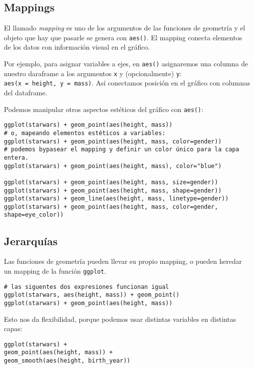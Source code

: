 \documentclass[]{article}
\begin{document}
\hypertarget{mappings}{%
\subsection{Mappings}\label{mappings}}

El llamado \emph{mapping} es uno de los argumentos de las funciones de
geometría y el objeto que hay que pasarle se genera con \texttt{aes()}.
El mapping conecta elementos de los datos con información visual en el
gráfico.

Por ejemplo, para asignar variables a ejes, en \texttt{aes()}
asignaremos una columna de nuestro daraframe a los argumentos \texttt{x}
y (opcionalmente) \texttt{y}: \texttt{aes(x\ =\ height,\ y\ =\ mass)}.
Así conectamos posición en el gráfico con columnas del dataframe.

Podemos manipular otros aspectos estéticos del gráfico con
\texttt{aes()}:

\begin{verbatim}
ggplot(starwars) + geom_point(aes(height, mass))
# o, mapeando elementos estéticos a variables:
ggplot(starwars) + geom_point(aes(height, mass, color=gender))
# podemos bypasear el mapping y definir un color único para la capa entera.
ggplot(starwars) + geom_point(aes(height, mass), color="blue")

ggplot(starwars) + geom_point(aes(height, mass, size=gender))
ggplot(starwars) + geom_point(aes(height, mass, shape=gender))
ggplot(starwars) + geom_line(aes(height, mass, linetype=gender)) 
ggplot(starwars) + geom_point(aes(height, mass, color=gender, shape=eye_color))
\end{verbatim}

\hypertarget{jerarquuxedas}{%
\subsection{Jerarquías}\label{jerarquuxedas}}

Las funciones de geometría pueden llevar su propio mapping, o pueden
heredar un mapping de la función \texttt{ggplot}.

\begin{verbatim}
# las siguentes dos expresiones funcionan igual
ggplot(starwars, aes(height, mass)) + geom_point()
ggplot(starwars) + geom_point(aes(height, mass))
\end{verbatim}

Esto nos da flexibilidad, porque podemos usar distintas variables en
distintas capas:

\begin{verbatim}
ggplot(starwars) + 
geom_point(aes(height, mass)) + 
geom_smooth(aes(height, birth_year))
\end{verbatim}
\end{document}
